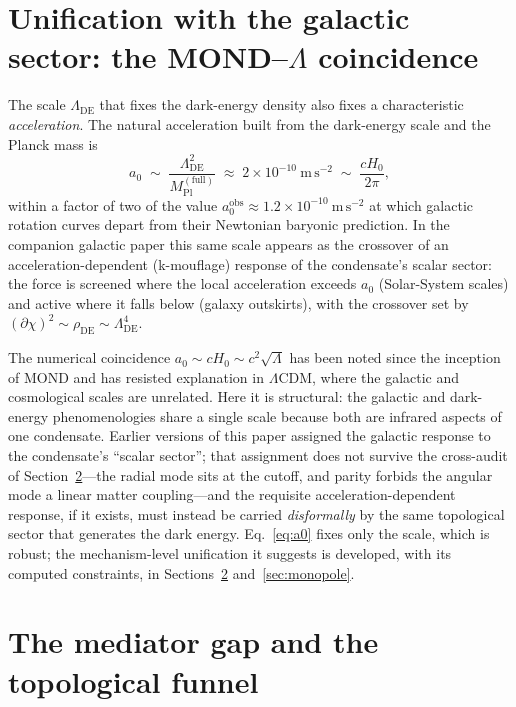 \documentclass[11pt]{article}
\newcommand{\beq}{\begin{equation}}
\newcommand{\eeq}{\end{equation}}
\newcommand{\LDE}{\Lambda_{\mathrm{DE}}}
\begin{document}
\section{Unification with the galactic sector: the
MOND--$\Lambda$ coincidence}
\label{sec:mond}

The scale $\LDE$ that fixes the dark-energy density also fixes a
characteristic \emph{acceleration}.  The natural acceleration built
from the dark-energy scale and the Planck mass is
\beq
a_0 \;\sim\; \frac{\LDE^2}{M_{\mathrm{Pl}}^{\mathrm{(full)}}}
\;\approx\; 2\times10^{-10}\ \mathrm{m\,s^{-2}}
\;\sim\; \frac{cH_0}{2\pi},
\label{eq:a0}
\eeq
within a factor of two of the value
$a_0^{\mathrm{obs}}\approx1.2\times10^{-10}\ \mathrm{m\,s^{-2}}$ at
which galactic rotation curves depart from their Newtonian baryonic
prediction.  In the companion galactic paper \cite{Cheng:2025sparc}
this same scale appears as the crossover of an acceleration-dependent
(k-mouflage) response of the condensate's scalar sector: the force is
screened where the local acceleration exceeds $a_0$ (Solar-System
scales) and active where it falls below (galaxy outskirts), with the
crossover set by $(\partial\chi)^2\sim\rho_{\mathrm{DE}}\sim\LDE^4$.

The numerical coincidence $a_0\sim cH_0\sim c^2\sqrt{\Lambda}$ has been
noted since the inception of MOND and has resisted explanation in
$\Lambda$CDM, where the galactic and cosmological scales are
unrelated.  Here it is structural: the galactic and dark-energy
phenomenologies share a single scale because both are infrared
aspects of one condensate.  Earlier versions of this paper assigned
the galactic response to the condensate's ``scalar sector''; that
assignment does not survive the cross-audit of
Section~\ref{sec:mediator}---the radial mode sits at the cutoff, and
parity forbids the angular mode a linear matter coupling---and the
requisite acceleration-dependent response, if it exists, must instead
be carried \emph{disformally} by the same topological sector that
generates the dark energy.  Eq.~\eqref{eq:a0} fixes only the scale,
which is robust; the mechanism-level unification it suggests is
developed, with its computed constraints, in
Sections~\ref{sec:mediator} and~\ref{sec:monopole}.

\section{The mediator gap and the topological funnel}
\label{sec:mediator}
\end{document}
